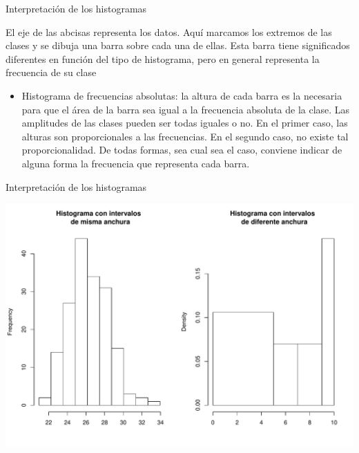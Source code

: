\documentclass[
  ignorenonframetext,
]{beamer}
\providecommand{\tightlist}{%
  \setlength{\itemsep}{0pt}\setlength{\parskip}{0pt}}
\begin{document}
\begin{frame}{Interpretación de los histogramas}
\protect\hypertarget{interpretaciuxf3n-de-los-histogramas}{}

El eje de las abcisas representa los datos. Aquí marcamos los extremos
de las clases y se dibuja una barra sobre cada una de ellas. Esta barra
tiene significados diferentes en función del tipo de histograma, pero en
general representa la frecuencia de su clase

\begin{itemize}
\tightlist
\item
  Histograma de frecuencias absolutas: la altura de cada barra es la
  necesaria para que el área de la barra sea igual a la frecuencia
  absoluta de la clase. Las amplitudes de las clases pueden ser todas
  iguales o no. En el primer caso, las alturas son proporcionales a las
  frecuencias. En el segundo caso, no existe tal proporcionalidad. De
  todas formas, sea cual sea el caso, conviene indicar de alguna forma
  la frecuencia que representa cada barra.
\end{itemize}

\end{frame}

\begin{frame}{Interpretación de los histogramas}
\protect\hypertarget{interpretaciuxf3n-de-los-histogramas-1}{}

\includegraphics{Tema9.-Agrupacion_datos_cuantitativos_files/figure-beamer/unnamed-chunk-43-1.pdf}

\end{frame}
\end{document}
